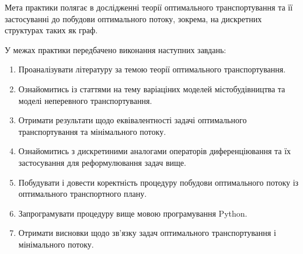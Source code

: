 Мета практики полягає в дослідженні теорії оптимального транспортування та її застосуванні до побудови оптимального 
потоку, зокрема, на дискретних структурах таких як граф.

У межах практики передбачено виконання наступних завдань:

\begin{enumerate}
    \item Проаналізувати літературу за темою теорії оптимального транспортування.
    \item Ознайомитись із статтями на тему варіаціних моделей містобудівництва та моделі неперевного транспортування.
    \item Отримати результати щодо еквівалентності задачі оптимального транспортування та мінімального потоку.
    \item Ознайомитись з дискретиними аналогами операторів диференціювання та їх застосування для реформулювання задач вище.
    \item Побудувати і довести коректність процедуру побудови оптимального потоку із оптимального транспортного плану.
    \item Запрограмувати процедуру вище мовою програмування Python.
    \item Отримати висновки щодо зв'язку задач оптимального транспортування і мінімального потоку.
\end{enumerate}
